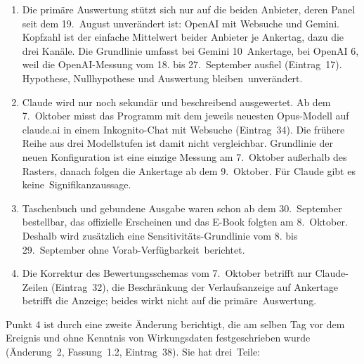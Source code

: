 \documentclass[11pt]{article}
\providecommand{\tightlist}{\setlength{\itemsep}{0pt}\setlength{\parskip}{0pt}}
\begin{document}
\begin{enumerate}
\def\labelenumi{\arabic{enumi}.}
\tightlist
\item
  Die primäre Auswertung stützt sich nur auf die beiden Anbieter, deren Panel seit dem 19.~August unverändert ist: OpenAI mit Websuche und Gemini. Kopfzahl ist der einfache Mittelwert beider Anbieter je Ankertag, dazu die drei Kanäle. Die Grundlinie umfasst bei Gemini 10~Ankertage, bei OpenAI 6, weil die OpenAI-Messung vom 18. bis 27.~September ausfiel (Eintrag~17). Hypothese, Nullhypothese und Auswertung bleiben~\mbox{unverändert.}
\item
  Claude wird nur noch sekundär und beschreibend ausgewertet. Ab dem 7.~Oktober misst das Programm mit dem jeweils neuesten Opus-Modell auf claude.ai in einem Inkognito-Chat mit Websuche (Eintrag~34). Die frühere Reihe aus drei Modellstufen ist damit nicht vergleichbar. Grundlinie der neuen Konfiguration ist eine einzige Messung am 7.~Oktober außerhalb des Rasters, danach folgen die Ankertage ab dem 9.~Oktober. Für Claude gibt es keine~\mbox{Signifikanzaussage.}
\item
  Taschenbuch und gebundene Ausgabe waren schon ab dem 30.~September bestellbar, das offizielle Erscheinen und das E-Book folgten am 8.~Oktober. Deshalb wird zusätzlich eine Sensitivitäts-Grundlinie vom 8. bis 29.~September ohne Vorab-Verfügbarkeit~\mbox{berichtet.}
\item
  Die Korrektur des Bewertungsschemas vom 7.~Oktober betrifft nur Claude-Zeilen (Eintrag~32), die Beschränkung der Verlaufsanzeige auf Ankertage betrifft die Anzeige; beides wirkt nicht auf die primäre~\mbox{Auswertung.}
\end{enumerate}

Punkt 4 ist durch eine zweite Änderung berichtigt, die am selben Tag vor dem Ereignis und ohne Kenntnis von Wirkungsdaten festgeschrieben wurde (Änderung~2, Fassung~1.2, Eintrag~38). Sie hat drei~\mbox{Teile:}
\end{document}
